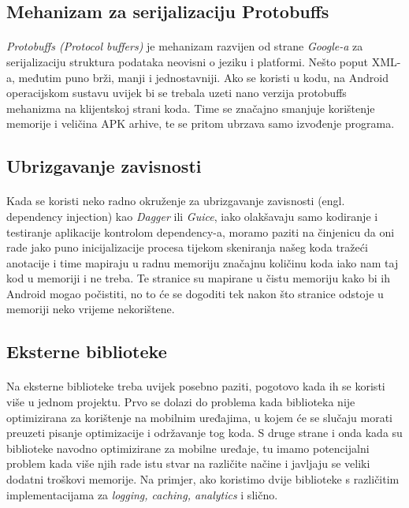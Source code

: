 \documentclass[times, utf8, zavrsni]{fer}
\begin{document}
\subsection{Mehanizam za serijalizaciju Protobuffs}
\paragraph{}
\textit{Protobuffs (Protocol buffers)} je mehanizam razvijen od strane \textit{Google-a} za serijalizaciju struktura podataka neovisni o jeziku i platformi. Nešto poput XML-a, međutim puno brži, manji i jednostavniji. Ako se koristi u kodu, na Android operacijskom sustavu uvijek bi se trebala uzeti nano verzija protobuffs mehanizma na klijentskoj strani koda. Time se značajno smanjuje korištenje memorije i veličina APK arhive, te se pritom ubrzava samo izvođenje programa.

\subsection{Ubrizgavanje zavisnosti}
\paragraph{}
Kada se koristi neko radno okruženje za ubrizgavanje zavisnosti (engl. dependency injection) kao \textit{Dagger} ili \textit{Guice}, iako olakšavaju samo kodiranje i testiranje aplikacije kontrolom dependency-a, moramo paziti na činjenicu da oni rade jako puno inicijalizacije procesa tijekom skeniranja našeg koda tražeći anotacije i time mapiraju u radnu memoriju značajnu količinu koda iako nam taj kod u memoriji i ne treba. Te stranice su mapirane u čistu memoriju kako bi ih Android mogao počistiti, no to će se dogoditi tek nakon što stranice odstoje u memoriji neko vrijeme nekorištene.

\subsection{Eksterne biblioteke}
\paragraph{}
Na eksterne biblioteke treba uvijek posebno paziti, pogotovo kada ih se koristi više u jednom projektu. Prvo se dolazi do problema kada biblioteka nije optimizirana za korištenje na mobilnim uređajima, u kojem će se slučaju morati preuzeti pisanje optimizacije i održavanje tog koda. S druge strane i onda kada su biblioteke navodno optimizirane za mobilne uređaje, tu imamo potencijalni problem kada više njih rade istu stvar na različite načine i javljaju se veliki dodatni troškovi memorije. Na primjer, ako koristimo dvije biblioteke s različitim implementacijama za \textit{logging, caching, analytics} i slično.
\end{document}
